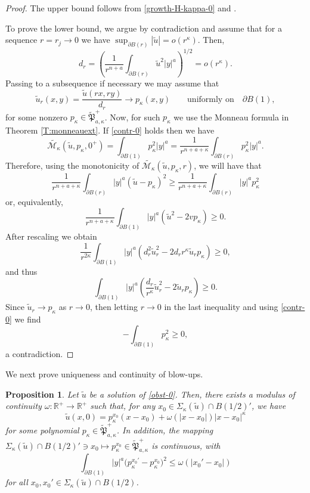 \documentclass[11pt]{amsart}
\theoremstyle{plain}
\newtheorem{prop}[thrm]{Proposition}
\numberwithin{equation}{section}
\begin{document}
\begin{proof}
The upper bound follows from \eqref{growth-H-kappa-0} and \cite[Lemma 3.4]{BFR}.

To prove the lower bound, we argue by contradiction and assume that for a sequence $r=r_j\to0$ we have $\sup_{\partial B(r)}|\tilde u|= o(r^\kappa)$.
Then,
\begin{equation}\label{contr-0}
d_r=\left(\frac{1}{r^{n+a}}\int_{\partial B(r)} \tilde u^2 |y|^a \right)^{1/2}=o(r^\kappa).
\end{equation}
Passing to a subsequence if necessary we may assume that
\[\tilde u_r(x,y)=\frac{\tilde u(rx,ry)}{d_r}\to p_\kappa(x,y)\qquad \textrm{uniformly on}\quad \partial B(1),\]
for some nonzero $p_\kappa\in\tilde{\mathfrak P}_{a,\kappa}^+$.
Now, for such $p_\kappa$ we use the Monneau formula in Theorem \ref{T:monneauext}.
If \eqref{contr-0} holds then we have
\[\tilde{\mathcal M_\kappa}(\tilde u,p_\kappa,0^+)=\int_{\partial B(1)} p_\kappa^2 |y|^a=\frac{1}{r^{n+a+\kappa}}\int_{\partial B(r)}p_\kappa^2|y|^a.
\]
Therefore, using the monotonicity of $\tilde{\mathcal M_\kappa}(\tilde u,p_\kappa,r)$, we will have that
\[\frac{1}{r^{n+a+\kappa}}\int_{\partial B(r)}|y|^a(\tilde u-p_\kappa)^2\geq \frac{1}{r^{n+a+\kappa}}\int_{\partial B(r)}|y|^ap_\kappa^2\]
or, equivalently,
\[\frac{1}{r^{n+a+\kappa}}\int_{\partial B(1)}|y|^a(\tilde u^2-2v p_\kappa)\geq0.\]
After rescaling we obtain
\[\frac{1}{r^{2\kappa}}\int_{\partial B(1)} |y|^a(d_r^2\tilde u_r^2-2d_rr^\kappa \tilde u_rp_\kappa)\geq 0,\]
and thus
\[\int_{\partial B(1)} |y|^a\left(\frac{d_r}{r^\kappa}\tilde u_r^2-2 \tilde u_rp_\kappa\right)\geq 0.\]
Since $\tilde u_r\to p_\kappa$ as $r\to0$, then letting $r\to0$ in the last inequality and using \eqref{contr-0} we find
\[-\int_{\partial B(1)}p_\kappa^2\geq0,\]
a contradiction.
\end{proof}

We next prove uniqueness and continuity of blow-ups.

\begin{prop}\label{uniqeness-0}
Let $\tilde u$ be a solution of \eqref{obst-0}.
Then, there exists a modulus of continuity $\omega:{\mathbb R}^+\to{\mathbb R}^+$ such that, for any $x_0\in \Sigma_\kappa(\tilde u)\cap B(1/2)'$, we have
\[\tilde u(x,0)=p_\kappa^{x_0}(x-x_0)+\omega(|x-x_0|)|x-x_0|^\kappa\]
for some polynomial $p_\kappa\in \tilde{\mathfrak P}_{a,\kappa}^+$.
In addition, the mapping $\Sigma_\kappa(\tilde u)\cap B(1/2)'\ni x_0\mapsto p_\kappa^{x_0}\in\tilde{\mathfrak P}_{a,\kappa}^+$ is continuous, with
\[\int_{\partial B(1)} |y|^a\bigl(p_\kappa^{x_0'}-p_\kappa^{x_0}\bigr)^2\leq \omega(|x_0'-x_0|)\]
for all $x_0,x_0'\in \Sigma_\kappa(\tilde u)\cap B(1/2)$.
\end{prop}
\end{document}
